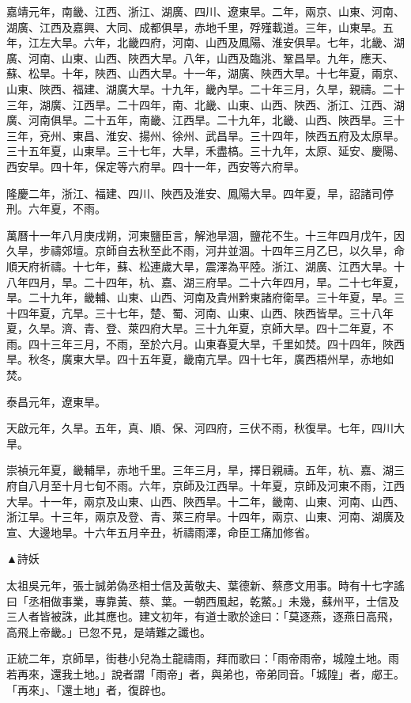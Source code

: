 \begin{pinyinscope}
嘉靖元年，南畿、江西、浙江、湖廣、四川、遼東旱。二年，兩京、山東、河南、湖廣、江西及嘉興、大同、成都俱旱，赤地千里，殍殣載道。三年，山東旱。五年，江左大旱。六年，北畿四府，河南、山西及鳳陽、淮安俱旱。七年，北畿、湖廣、河南、山東、山西、陜西大旱。八年，山西及臨洮、鞏昌旱。九年，應天、蘇、松旱。十年，陜西、山西大旱。十一年，湖廣、陜西大旱。十七年夏，兩京、山東、陜西、福建、湖廣大旱。十九年，畿內旱。二十年三月，久旱，親禱。二十三年，湖廣、江西旱。二十四年，南、北畿、山東、山西、陜西、浙江、江西、湖廣、河南俱旱。二十五年，南畿、江西旱。二十九年，北畿、山西、陜西旱。三十三年，兗州、東昌、淮安、揚州、徐州、武昌旱。三十四年，陜西五府及太原旱。三十五年夏，山東旱。三十七年，大旱，禾盡槁。三十九年，太原、延安、慶陽、西安旱。四十年，保定等六府旱。四十一年，西安等六府旱。

隆慶二年，浙江、福建、四川、陜西及淮安、鳳陽大旱。四年夏，旱，詔諸司停刑。六年夏，不雨。

萬曆十一年八月庚戌朔，河東鹽臣言，解池旱涸，鹽花不生。十三年四月戊午，因久旱，步禱郊壇。京師自去秋至此不雨，河井並涸。十四年三月乙巳，以久旱，命順天府祈禱。十七年，蘇、松連歲大旱，震澤為平陸。浙江、湖廣、江西大旱。十八年四月，旱。二十四年，杭、嘉、湖三府旱。二十六年四月，旱。二十七年夏，旱。二十九年，畿輔、山東、山西、河南及貴州黔東諸府衛旱。三十年夏，旱。三十四年夏，亢旱。三十七年，楚、蜀、河南、山東、山西、陜西皆旱。三十八年夏，久旱。濟、青、登、萊四府大旱。三十九年夏，京師大旱。四十二年夏，不雨。四十三年三月，不雨，至於六月。山東春夏大旱，千里如焚。四十四年，陜西旱。秋冬，廣東大旱。四十五年夏，畿南亢旱。四十七年，廣西梧州旱，赤地如焚。

泰昌元年，遼東旱。

天啟元年，久旱。五年，真、順、保、河四府，三伏不雨，秋復旱。七年，四川大旱。

崇禎元年夏，畿輔旱，赤地千里。三年三月，旱，擇日親禱。五年，杭、嘉、湖三府自八月至十月七旬不雨。六年，京師及江西旱。十年夏，京師及河東不雨，江西大旱。十一年，兩京及山東、山西、陜西旱。十二年，畿南、山東、河南、山西、浙江旱。十三年，兩京及登、青、萊三府旱。十四年，兩京、山東、河南、湖廣及宣、大邊地旱。十六年五月辛丑，祈禱雨澤，命臣工痛加修省。

▲詩妖

太祖吳元年，張士誠弟偽丞相士信及黃敬夫、葉德新、蔡彥文用事。時有十七字謠曰「丞相做事業，專靠黃、蔡、葉。一朝西風起，乾鱉。」未幾，蘇州平，士信及三人者皆被誅，此其應也。建文初年，有道士歌於途曰：「莫逐燕，逐燕日高飛，高飛上帝畿。」已忽不見，是靖難之讖也。

正統二年，京師旱，街巷小兒為土龍禱雨，拜而歌曰：「雨帝雨帝，城隍土地。雨若再來，還我土地。」說者謂「雨帝」者，與弟也，帝弟同音。「城隍」者，郕王。「再來」、「還土地」者，復辟也。


\end{pinyinscope}
